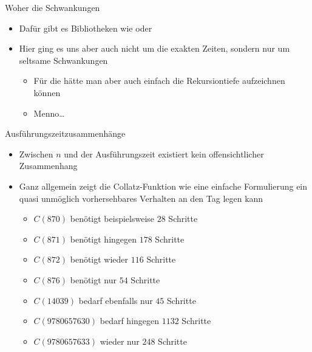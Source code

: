 {\begin{frame}{Woher die Schwankungen}
\begin{itemize}[<+(1)->]
\begin{itemize}
        \item Das Zeitmessen selbst braucht Zeit
        \item Die Java Virtual Machine hat zu Beginn einiges zusätzlich zu tun
        \item Dienste wie die Garbage-Collection können unkontrolliert dazwischenfunken
    \end{itemize}
    \item Dafür gibt es Bibliotheken wie  oder 
    \item Hier ging es uns aber auch nicht um die exakten Zeiten, sondern nur um seltsame Schwankungen \begin{itemize}
        \item Für die hätte man aber auch einfach die Rekursiontiefe aufzeichnen können
        \item Menno\ldots
    \end{itemize}
\end{itemize}
\end{frame}
}
\fi

\begin{frame}{Ausführungszeitzusammenhänge}
    \begin{itemize}[<+(1)->]
        \itemsep8pt
        \item Zwischen \(n\) und der Ausführungszeit existiert kein offensichtlicher Zusammenhang
        \item Ganz allgemein zeigt die Collatz-Funktion wie eine einfache Formulierung ein quasi unmöglich vorhersehbares Verhalten an den Tag legen kann\; \begin{itemize}
            \item $C(870)$ benötigt beispielsweise $28$ Schritte
            \item $C(871)$ benötigt hingegen $178$ Schritte
            \item $C(872)$ benötigt wieder $116$ Schritte
            \item $C(876)$ benötigt nur $54$ Schritte
            \item $C(14039)$ bedarf ebenfalls nur $45$ Schritte
            \item $C(9780657630)$ bedarf hingegen $1132$ Schritte
            \item $C(9780657633)$ wieder nur $248$ Schritte
        \end{itemize}
    \end{itemize}
\end{frame}

